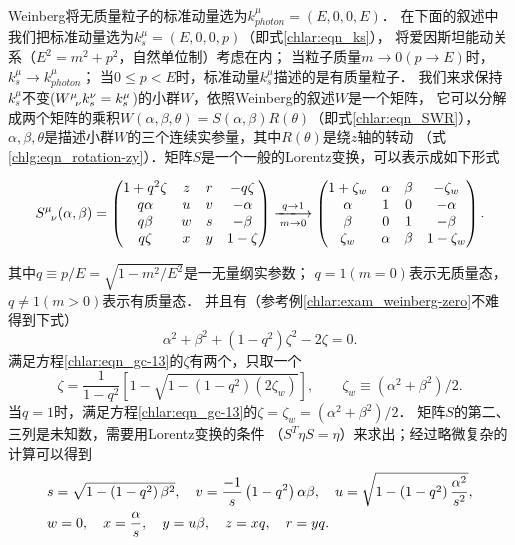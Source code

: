 Weinberg将无质量粒子的标准动量选为$k_{photon}^\mu=(E,0,0,E)$．
在下面的叙述中我们把标准动量选为${k^\mu_s } = ({E,0,0,p} )$（即式\eqref{chlar:eqn_ks}），
将爱因斯坦能动关系（$E^2=m^2+p^2$，自然单位制）考虑在内；
当粒子质量$m\to 0(p\to E)$时，$k^\mu_s \to k_{photon}^\mu$；
当$0 \leqslant p <E$时，标准动量$k^\mu_s$描述的是有质量粒子．
我们来求保持$k^\mu_s$不变($W_{\hphantom{\mu}\nu} ^\mu {k^\nu_s } = {k^\mu_s }$)的小群$W$，依照Weinberg的叙述$W$是一个矩阵，
它可以分解成两个矩阵的乘积$W(\alpha,\beta,\theta) = S(\alpha,\beta)R(\theta)$（即式\eqref{chlar:eqn_SWR}），
$\alpha,\beta,\theta$是描述小群$W$的三个连续实参量，其中$R(\theta)$是绕$z$轴的转动
（式\eqref{chlg:eqn_rotation-zy}）．矩阵$S$是一个一般的Lorentz变换，可以表示成如下形式
\begin{small}
	\begin{equation}\label{chlar:eqn_Sab}
		S^\mu_{\hphantom{\mu}\nu}(\alpha,\beta) = \begin{pmatrix}
			{1 + {q^2}\zeta } &z&r&{ - q\zeta } \\
			{q\alpha }&u&v&{ - \alpha } \\
			{q\beta }& w&s&{ - \beta } \\
			{q\zeta }& x&y&{1 - \zeta }
		\end{pmatrix} 
		\xlongrightarrow[m\to 0]{q\to 1} \begin{pmatrix}
			{1 + \zeta_w } &\alpha&\beta&{ - \zeta_w } \\
			{\alpha }&1&0&{ - \alpha } \\
			{\beta }& 0&1&{ - \beta } \\
			{\zeta_w }& \alpha&\beta&{1 - \zeta_w }
		\end{pmatrix} .
	\end{equation}
\end{small}
其中$q\equiv p/E=\sqrt{1-m^2/E^2}$是一无量纲实参数；
$q=1(m=0)$表示无质量态，$q\neq 1 (m>0)$表示有质量态．
并且有（参考例\ref{chlar:exam_weinberg-zero}不难得到下式）
\begin{equation}\label{chlar:eqn_gc-13}
	{\alpha ^2} + {\beta ^2} + \left( {1 - {q^2}} \right){\zeta ^2} - 2\zeta  = 0 .
\end{equation}
满足方程\eqref{chlar:eqn_gc-13}的$\zeta$有两个，只取一个
\begin{equation}\label{chlar:eqn_gc-15}
	\zeta  = \frac{1}{{1 - {q^2}}}\left[ {1-\sqrt{1-({1-{q^2}})(2\zeta_w)} } \right],
	\qquad \zeta_w \equiv (\alpha ^2 + \beta ^2)/2 .
\end{equation}
当$q=1$时，满足方程\eqref{chlar:eqn_gc-13}的$\zeta=\zeta_w=(\alpha ^2 + \beta ^2)/2$．
矩阵$S$的第二、三列是未知数，需要用Lorentz变换的条件
（$S^T \eta S = \eta $）来求出；经过略微复杂的计算可以得到
\begin{align}
	&s = \sqrt {1 - \left( {1 - {q^2}} \right){\beta ^2}}, \quad
	v = \frac{{ - 1}}{s}\left( {1 - {q^2}} \right)\alpha \beta , \quad
	u = \sqrt {1 - \left( {1 - {q^2}} \right)\frac{{{\alpha ^2}}}{{{s^2}}}},   \notag \\
	&w = 0,\quad x = \frac{\alpha }{s}, \quad y = u\beta,  \quad z = xq,\quad r = yq . 
	\label{chlar:eqn_gc-18}
\end{align}

